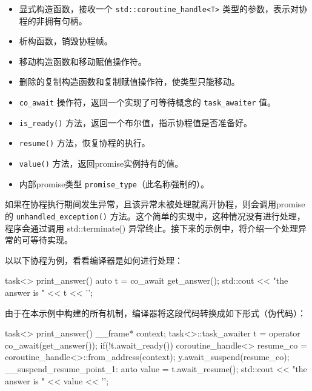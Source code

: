 \begin{itemize}
\item
显式构造函数，接收一个 \verb|std::coroutine_handle<T>| 类型的参数，表示对协程的非拥有句柄。

\item
析构函数，销毁协程帧。

\item
移动构造函数和移动赋值操作符。

\item
删除的复制构造函数和复制赋值操作符，使类型只能移动。

\item
\verb|co_await| 操作符，返回一个实现了可等待概念的 \verb|task_awaiter| 值。

\item
\verb|is_ready()| 方法，返回一个布尔值，指示协程值是否准备好。

\item
\verb|resume()| 方法，恢复协程的执行。

\item
\verb|value()| 方法，返回promise实例持有的值。

\item
内部promise类型 \verb|promise_type|（此名称强制的）。
\end{itemize}

如果在协程执行期间发生异常，且该异常未被处理就离开协程，则会调用promise的 \verb|unhandled_exception()| 方法。这个简单的实现中，这种情况没有进行处理，程序会通过调用 std::terminate() 异常终止。接下来的示例中，将介绍一个处理异常的可等待实现。

以以下协程为例，看看编译器是如何进行处理：

\begin{cpp}
task<> print_answer()
{
    auto t = co_await get_answer();
    std::cout << "the answer is " << t << '\n';
}
\end{cpp}

由于在本示例中构建的所有机制，编译器将这段代码转换成如下形式（伪代码）：

\begin{cpp}
task<> print_answer()
{
    __frame* context;
    task<>::task_awaiter t = operator co_await(get_answer());
    if(!t.await_ready())
    {
        coroutine_handle<> resume_co =
            coroutine_handle<>::from_address(context);
        y.await_suspend(resume_co);
        __suspend_resume_point_1:
    }
    auto value = t.await_resume();
    std::cout << "the answer is " << value << '\n';
}
\end{cpp}

